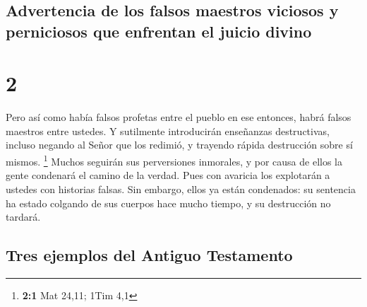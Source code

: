 \hypertarget{advertencia-de-los-falsos-maestros-viciosos-y-perniciosos-que-enfrentan-el-juicio-divino}{%
\subsection{Advertencia de los falsos maestros viciosos y perniciosos
que enfrentan el juicio
divino}\label{advertencia-de-los-falsos-maestros-viciosos-y-perniciosos-que-enfrentan-el-juicio-divino}}

\hypertarget{section-1}{%
\section{2}\label{section-1}}

 Pero así como había falsos profetas entre el pueblo en
ese entonces, habrá falsos maestros entre ustedes. Y sutilmente
introducirán enseñanzas destructivas, incluso negando al Señor que los
redimió, y trayendo rápida destrucción sobre sí mismos. \footnote{\textbf{2:1}
  Mat 24,11; 1Tim 4,1}  Muchos seguirán sus perversiones
inmorales, y por causa de ellos la gente condenará el camino de la
verdad.  Pues con avaricia los explotarán a ustedes con
historias falsas. Sin embargo, ellos ya están condenados: su sentencia
ha estado colgando de sus cuerpos hace mucho tiempo, y su destrucción no
tardará.

\hypertarget{tres-ejemplos-del-antiguo-testamento}{%
\subsection{Tres ejemplos del Antiguo
Testamento}\label{tres-ejemplos-del-antiguo-testamento}}


